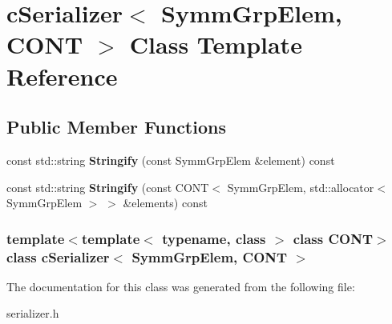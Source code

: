 \hypertarget{classcSerializer_3_01SymmGrpElem_00_01CONT_01_4}{\section{c\-Serializer$<$ \-Symm\-Grp\-Elem, \-C\-O\-N\-T $>$ \-Class \-Template \-Reference}
\label{classcSerializer_3_01SymmGrpElem_00_01CONT_01_4}
}
\subsection*{\-Public \-Member \-Functions}
\begin{DoxyCompactItemize}
\item 
\hypertarget{classcSerializer_3_01SymmGrpElem_00_01CONT_01_4_a9f2b83d7cb75cfad5bd2a1c15fa968c1}{const std\-::string {\bfseries \-Stringify} (const \-Symm\-Grp\-Elem \&element) const }\label{classcSerializer_3_01SymmGrpElem_00_01CONT_01_4_a9f2b83d7cb75cfad5bd2a1c15fa968c1}

\item 
\hypertarget{classcSerializer_3_01SymmGrpElem_00_01CONT_01_4_adc87f8732b096f7add2f18f486bada73}{const std\-::string {\bfseries \-Stringify} (const \-C\-O\-N\-T$<$ \-Symm\-Grp\-Elem, std\-::allocator$<$ \-Symm\-Grp\-Elem $>$ $>$ \&elements) const }\label{classcSerializer_3_01SymmGrpElem_00_01CONT_01_4_adc87f8732b096f7add2f18f486bada73}

\end{DoxyCompactItemize}
\subsubsection*{template$<$template$<$ typename, class $>$ class \-C\-O\-N\-T$>$ class c\-Serializer$<$ Symm\-Grp\-Elem, C\-O\-N\-T $>$}



\-The documentation for this class was generated from the following file\-:\begin{DoxyCompactItemize}
\item 
serializer.\-h\end{DoxyCompactItemize}
